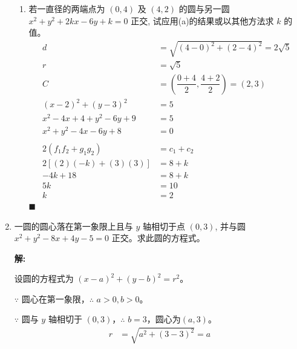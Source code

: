 \documentclass[10pt]{article}
\newcommand{\sol}{\textbf{解:} }
\begin{document}
\begin{enumerate}[leftmargin=*]
\begin{enumerate}
          \item 若一直径的两端点为 $(0,4)$ 及 $(4,2)$ 的圆与另一圆 $x^{2}+y^{2}+2 k x-6 y+k=0$ 正交, 试应用(a)的结果或以其他方法求 $k$ 的值。
                \begin{align*}
                  d                           & = \sqrt{(4 - 0)^2 + (2 - 4)^2} = 2\sqrt{5}                 \\
                  r                           & = \sqrt{5}                                                 \\
                  C                           & = \left(\dfrac{0 + 4}{2}, \dfrac{4 + 2}{2}\right) = (2, 3) \\
                  (x-2)^2 + (y-3)^2           & = 5                                                        \\
                  x^2 - 4x + 4 + y^2 - 6y + 9 & = 5                                                        \\
                  x^2 + y^2 - 4x - 6y + 8     & = 0                                                        \\
                  \\
                  2(f_1f_2 + g_1g_2)          & = c_1 + c_2                                                \\
                  2[(2)(-k) + (3)(3)]         & = 8 + k                                                    \\
                  -4k + 18                    & = 8 + k                                                    \\
                  5k                          & = 10                                                       \\
                  k                           & =2
                \end{align*} \hfill$\blacksquare$
        \end{enumerate}

  \item 一圆的圆心落在第一象限上且与 $y$ 轴相切于点 $(0,3)$, 并与圆 $x^{2}+y^{2}-8 x+4 y-5=0$ 正交。求此圆的方程式。

        \sol{}

        设圆的方程式为 $(x - a)^{2} + (y - b)^{2} = r^{2}$。

        $\because$ 圆心在第一象限，$\therefore$ $a > 0, b > 0$。

        $\because$ 圆与 $y$ 轴相切于 $(0, 3)$，$\therefore$ $b = 3$，圆心为$(a, 3)$。
        \begin{align*}
          r & = \sqrt{a^2 + (3 - 3)^2} = a \\
        \end{align*}


\end{enumerate}
\end{document}
